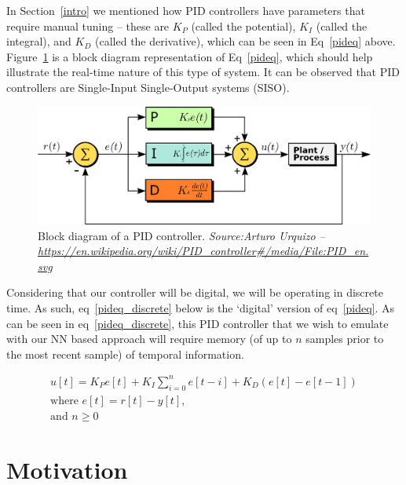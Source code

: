 \documentclass[10pt,twocolumn,letterpaper]{article}
\begin{document}
        In Section~\ref{intro} we mentioned how PID controllers have parameters that require manual tuning -- these are
        $K_P$ (called the potential), $K_I$ (called the integral), and $K_D$ (called the derivative), which can be seen
        in Eq~\ref{pideq} above. Figure~\ref{pidblock} is a block diagram representation of Eq~\ref{pideq}, which should
        help illustrate the real-time nature of this type of system. It can be observed that PID controllers are
        Single-Input Single-Output systems (SISO).
        
        \begin{figure}[h]
            \includegraphics[width=\linewidth]{./figures/pidBlock.jpg}
            \centering
            \caption{Block diagram of a PID controller. \textit{Source:Arturo Urquizo --
            \url{https://en.wikipedia.org/wiki/PID_controller\#/media/File:PID_en.svg}}}
            \label{pidblock}
        \end{figure}

        Considering that our controller will be digital, we will be operating in discrete time. As such,
        eq~\ref{pideq_discrete} below is the `digital' version of eq~\ref{pideq}. As can be seen in
        eq~\ref{pideq_discrete}, this PID controller that we wish to emulate with our NN based approach will require
        memory (of up to $n$ samples prior to the most recent sample) of temporal information.
        
        \begin{equation} \label{pideq_discrete}
            \begin{gathered}
                u[t] = K_P e[t] + K_I \sum_{i=0}^n e[t-i] + K_D \left(e[t]-e[t-1]\right) \\
                \text{where } e[t] = r[t] - y[t], \\
                \text{and $n \geq 0$}
            \end{gathered}
        \end{equation}

    \section{Motivation} \label{motivation}
        
\end{document}
